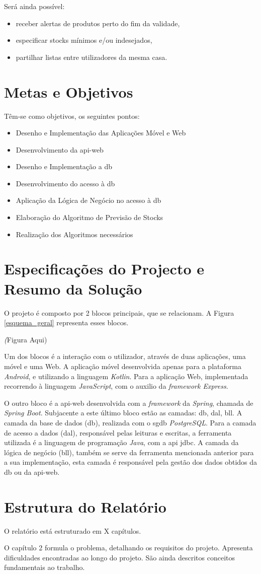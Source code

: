 Será ainda possível:
\begin{itemize} \itemsep 0pt
	\item receber alertas de produtos perto do fim da validade,
	\item especificar stocks mínimos e/ou indesejados,
	\item partilhar listas entre utilizadores da mesma casa.
\end{itemize}

%
%
\section{Metas e Objetivos} \label{sec12}
Têm-se como objetivos, os seguintes pontos:
\begin{itemize} \itemsep 0pt
	\item Desenho e Implementação das Aplicações Móvel e Web
	\item Desenvolvimento da \gls{api-web}
	\item Desenho e Implementação a \acrshort{db}
	\item Desenvolvimento do acesso à \acrshort{db}
	\item Aplicação da Lógica de Negócio no acesso à \acrshort{db}
	\item Elaboração do Algoritmo de Previsão de Stocks
	\item Realização dos Algoritmos necessários
\end{itemize}


%
%
\section{Especificações do Projecto e Resumo da Solução} \label{sec13}

O projeto é composto por 2 blocos principais, que se relacionam. A Figura \ref{esquema_geral} representa esses blocos. 

\textit(Figura Aqui)

Um dos blocos é a interação com o utilizador, através de duas aplicações, uma móvel e uma Web. A aplicação móvel desenvolvida apenas para a plataforma \textit{Android}, e utilizando a linguagem \textit{Kotlin}. Para a aplicação Web, implementada recorrendo à linguagem \textit{JavaScript}, com o auxilio da \textit{framework Express}. 

O outro bloco é a \gls{api-web} desenvolvida com a \textit{framework} da \textit{Spring}, chamada de \textit{Spring Boot}. Subjacente a este último bloco estão as camadas: \acrfull{db}, \acrfull{dal}, \acrfull{bll}.  A camada da base de dados (\acrshort{db}), realizada com o \acrfull{sgdb} \textit{PostgreSQL}. Para a camada de acesso a dados (\acrshort{dal}), responsável pelas leituras e escritas, a ferramenta utilizada é a linguagem de programação \textit{Java}, com a \gls{api} \acrfull{jdbc}. A camada da lógica de negócio (\acrshort{bll}), também se serve da ferramenta mencionada anterior para a sua implementação, esta camada é responsável pela gestão dos dados obtidos da \acrshort{db} ou da \gls{api-web}.


%
%
\section{Estrutura do Relatório} \label{sec14}
O relatório está estruturado em X capítulos.

O capítulo 2 formula o problema, detalhando os requisitos do projeto. Apresenta dificuldades encontradas ao longo do projeto. São ainda descritos conceitos fundamentais ao trabalho.
